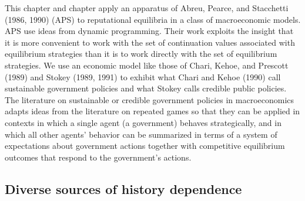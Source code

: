 This   chapter and chapter  apply an apparatus of Abreu, Pearce, and
Stacchetti (1986, 1990) (APS) to reputational equilibria in a
class of macroeconomic models.
APS use ideas from dynamic
programming.
  Their work exploits the
insight that it is more convenient to work with
the set of continuation values associated  with equilibrium
strategies than it is to work directly with the
 set of equilibrium strategies.  We use an economic model
like those  of
Chari, Kehoe, and Prescott (1989) and Stokey (1989, 1991)
to exhibit what Chari and Kehoe (1990) call sustainable
government policies and  what         
 Stokey calls credible public policies.    
The literature on
sustainable or credible government policies in macroeconomics adapts
ideas from the literature on repeated games so that they can
be applied in contexts in which a single agent (a government) behaves
strategically, and in which all other agents' behavior
can be summarized in terms of a system of expectations about government actions together with    competitive equilibrium outcomes that respond
 to the government's actions.
%
%
%
%
%
%
%
%

\subsection{Diverse sources of history dependence}

